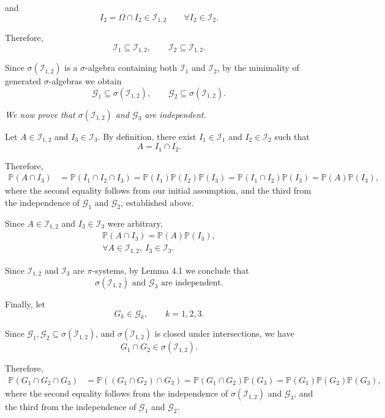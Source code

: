 \documentclass[11pt,a4paper]{article}
\begin{document}
and
\[
I_2=\Omega\cap I_2\in\mathcal I_{1,2}
\qquad\forall I_2\in\mathcal I_2.
\]

Therefore,
\[
\mathcal I_1\subseteq\mathcal I_{1,2},
\qquad
\mathcal I_2\subseteq\mathcal I_{1,2}.
\]

Since $\sigma(\mathcal I_{1,2})$ is a $\sigma$-algebra containing both $\mathcal I_1$ and $\mathcal I_2$, by the minimality of generated $\sigma$-algebras we obtain
\[
\mathcal G_1\subseteq\sigma(\mathcal I_{1,2}),
\qquad
\mathcal G_2\subseteq\sigma(\mathcal I_{1,2}).
\]

\emph{We now prove that $\sigma(\mathcal I_{1,2})$ and $\mathcal G_3$ are independent.}

Let $A\in\mathcal I_{1,2}$ and $I_3\in\mathcal I_3$. By definition, there exist $I_1\in\mathcal I_1$ and $I_2\in\mathcal I_2$ such that
\[
A=I_1\cap I_2.
\]

Therefore,
\[
\begin{aligned}
\mathbb P(A\cap I_3)
&=\mathbb P(I_1\cap I_2\cap I_3) =\mathbb P(I_1)\mathbb P(I_2)\mathbb P(I_3) =\mathbb P(I_1\cap I_2)\mathbb P(I_3) =\mathbb P(A)\mathbb P(I_3),
\end{aligned}
\]
where the second equality follows from our initial assumption, and the third from the independence of $\mathcal G_1$ and $\mathcal G_2$, established above.

Since $A\in\mathcal I_{1,2}$ and $I_3\in\mathcal I_3$ were arbitrary,
\[
\begin{gathered}
\mathbb P(A\cap I_3)=\mathbb P(A)\mathbb P(I_3),\\
\forall A\in\mathcal I_{1,2},\ I_3\in\mathcal I_3.
\end{gathered}
\]

Since $\mathcal I_{1,2}$ and $\mathcal I_3$ are $\pi$-systems, by Lemma 4.1 we conclude that
\[
\sigma(\mathcal I_{1,2})
\text{ and }\mathcal G_3
\text{ are independent}.
\]

Finally, let
\[
G_k\in\mathcal G_k,
\qquad k=1,2,3.
\]

Since $\mathcal G_1,\mathcal G_2\subseteq\sigma(\mathcal I_{1,2})$, and $\sigma(\mathcal I_{1,2})$ is closed under intersections, we have
\[
G_1\cap G_2\in\sigma(\mathcal I_{1,2}).
\]

Therefore,
\[
\begin{aligned}
\mathbb P(G_1\cap G_2\cap G_3)
&=\mathbb P((G_1\cap G_2)\cap G_3) =\mathbb P(G_1\cap G_2)\mathbb P(G_3) =\mathbb P(G_1)\mathbb P(G_2)\mathbb P(G_3),
\end{aligned}
\]
where the second equality follows from the independence of $\sigma(\mathcal I_{1,2})$ and $\mathcal G_3$, and the third from the independence of $\mathcal G_1$ and $\mathcal G_2$.
\end{document}
